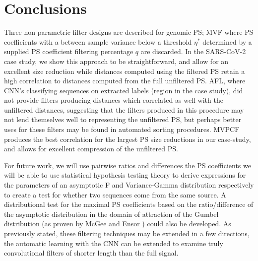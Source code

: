 \documentclass[10pt,conference]{IEEEtran}
\begin{document}
\section{Conclusions}

\noindent Three non-parametric filter designs are described for genomic PS; MVF where PS coefficients with a between sample variance below a threshold $\eta^*$ determined by a supplied PS coefficient filtering percentage $q$ are discarded. In the SARS-CoV-2 case study, we show this approach to be straightforward, and allow for an excellent size reduction while distances computed using the filtered PS retain a high correlation to distances computed from the full unfiltered PS. AFL, where CNN's classifying sequences on extracted labels (region in the case study), did not provide filters producing distances which correlated as well with the unfiltered distances, suggesting that the filters produced in this procedure may not lend themselves well to representing the unfiltered PS, but perhaps better uses for these filters may be found in automated sorting procedures. MVPCF produces the best correlation for the largest PS size reductions in our case-study, and allows for excellent compression of the unfiltered PS. 

\label{sec:conc}

For future work, we will use pairwise ratios and differences the PS coefficients we will be able to use statistical hypothesis testing theory to derive expressions for the parameters of an asymptotic F and Variance-Gamma distribution respectively to create a test for whether two sequences come from the same source.  
A distributional test for the maximal PS coefficients based on the ratio/difference of the asymptotic distribution in the domain of attraction of the Gumbel distribution (as proven by McGee and Ensor \cite{mcg98}) could also be developed. 
As previously stated, these filtering techniques may be extended in a few directions, the automatic learning with the CNN can be extended to examine truly convolutional filters of shorter length than the full signal. 
\end{document}
